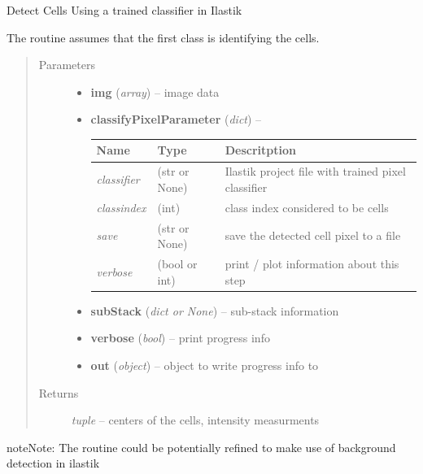 \documentclass[letterpaper,10pt,english]{sphinxmanual}
\begin{document}
\begin{fulllineitems}
\label{api/ClearMap.ImageProcessing:ClearMap.ImageProcessing.IlastikClassification.classifyCells}
Detect Cells Using a trained classifier in Ilastik

The routine assumes that the first class is identifying the cells.
\begin{quote}\begin{description}
\item[{Parameters}] \leavevmode\begin{itemize}
\item {} 
\textbf{img} (\emph{array}) --
image data

\item {} 
\textbf{classifyPixelParameter} (\emph{dict}) --

\begin{tabulary}{\linewidth}{|L|L|L|}
\hline
\textsf{\relax 
Name
} & \textsf{\relax 
Type
} & \textsf{\relax 
Descritption
}\\
\hline
\emph{classifier}
 & 
(str or  None)
 & 
Ilastik project file with trained pixel classifier
\\
\hline
\emph{classindex}
 & 
(int)
 & 
class index considered to be cells
\\
\hline
\emph{save}
 & 
(str or None)
 & 
save the detected cell pixel to a file
\\
\hline
\emph{verbose}
 & 
(bool or int)
 & 
print / plot information about this step
\\
\hline\end{tabulary}


\item {} 
\textbf{subStack} (\emph{dict or None}) --
sub-stack information

\item {} 
\textbf{verbose} (\emph{bool}) --
print progress info

\item {} 
\textbf{out} (\emph{object}) --
object to write progress info to

\end{itemize}

\item[{Returns}] \leavevmode
\emph{tuple} --
centers of the cells, intensity measurments

\end{description}\end{quote}

\begin{notice}{note}{Note:}
The routine could be potentially refined to make use of background
detection in ilastik
\end{notice}

\end{fulllineitems}
\end{document}

